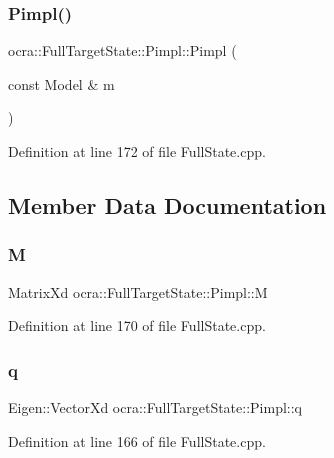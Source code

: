 \subsubsection{\texorpdfstring{Pimpl()}{Pimpl()}}
{\footnotesize\ttfamily ocra\+::\+Full\+Target\+State\+::\+Pimpl\+::\+Pimpl (\begin{DoxyParamCaption}\item[{const Model \&}]{m }\end{DoxyParamCaption})\hspace{0.3cm}{\ttfamily [inline]}}



Definition at line 172 of file Full\+State.\+cpp.



\subsection{Member Data Documentation}
\hypertarget{structocra_1_1FullTargetState_1_1Pimpl_aaf42a0f7ecf1e3750695edc06fb06c11}{}\label{structocra_1_1FullTargetState_1_1Pimpl_aaf42a0f7ecf1e3750695edc06fb06c11} 
\subsubsection{\texorpdfstring{M}{M}}
{\footnotesize\ttfamily Matrix\+Xd ocra\+::\+Full\+Target\+State\+::\+Pimpl\+::M}



Definition at line 170 of file Full\+State.\+cpp.

\hypertarget{structocra_1_1FullTargetState_1_1Pimpl_afb9abfe35480d2dea95ed9d54e8906df}{}\label{structocra_1_1FullTargetState_1_1Pimpl_afb9abfe35480d2dea95ed9d54e8906df} 
\subsubsection{\texorpdfstring{q}{q}}
{\footnotesize\ttfamily Eigen\+::\+Vector\+Xd ocra\+::\+Full\+Target\+State\+::\+Pimpl\+::q}



Definition at line 166 of file Full\+State.\+cpp.

